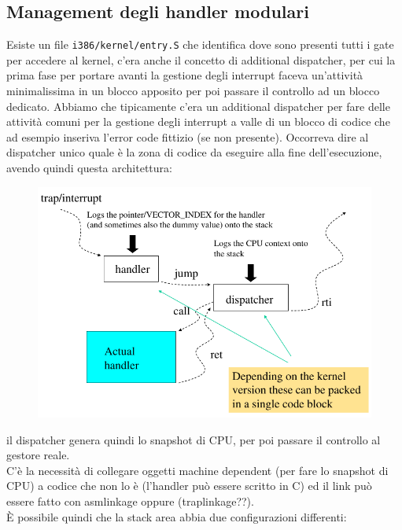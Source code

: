 \documentclass[12pt, oneside]{extbook}
\begin{document}
\subsection{Management degli handler modulari}
Esiste un file \texttt{i386/kernel/entry.S} che identifica dove sono presenti tutti i gate per accedere al kernel, c'era anche il concetto di additional dispatcher, per cui la prima fase per portare avanti la gestione degli interrupt faceva un'attività minimalissima in un blocco apposito per poi passare il controllo ad un blocco dedicato. Abbiamo che tipicamente c'era un additional dispatcher per fare delle attività comuni per la gestione degli interrupt a valle di un blocco di codice che ad esempio inseriva l'error code fittizio (se non presente). Occorreva dire al dispatcher unico quale è la zona di codice da eseguire alla fine dell'esecuzione, avendo quindi questa architettura:
\begin{figure}[!h]
	\includegraphics[scale=0.4]{immagini/interrupt_dispatcher.png}
\end{figure}
il dispatcher genera quindi lo snapshot di CPU, per poi passare il controllo al gestore reale.\\C'è la necessità di collegare oggetti machine dependent (per fare lo snapshot di CPU) a codice che non lo è (l'handler può essere scritto in C) ed il link può essere fatto con asmlinkage oppure (traplinkage??).\\È possibile quindi che la stack area abbia due configurazioni differenti:
\end{document}

